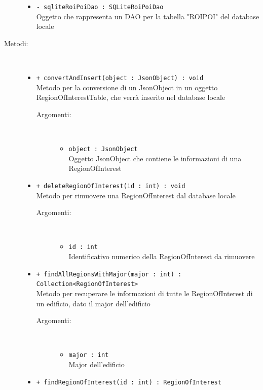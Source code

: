\documentclass[../DefinizioneDiProdotto.tex]{subfiles}
\begin{document}
\begin{description}
\begin{itemize}
\item \texttt{- sqliteRoiPoiDao : SQLiteRoiPoiDao}\\
Oggetto che rappresenta un DAO per la tabella "ROIPOI" del database locale

\end{itemize}
\item[Metodi:] \
\begin{itemize}
\item \texttt{+ convertAndInsert(object : JsonObject) : void}\\
Metodo per la conversione di un JsonObject in un oggetto RegionOfInterestTable, che verrà inserito nel database locale
 \begin{description}
\item[Argomenti:] \
\begin{itemize}
\item \texttt{object : JsonObject}\\
Oggetto JsonObject che contiene le informazioni di una RegionOfInterest\end{itemize}
\end{description}
\item \texttt{+ deleteRegionOfInterest(id : int) : void}\\
Metodo per rimuovere una RegionOfInterest dal database locale
 \begin{description}
\item[Argomenti:] \
\begin{itemize}
\item \texttt{id : int}\\
Identificativo numerico della RegionOfInterest da rimuovere\end{itemize}
\end{description}
\item \texttt{+ findAllRegionsWithMajor(major : int) : Collection<RegionOfInterest>}\\
Metodo per recuperare le informazioni di tutte le RegionOfInterest di un edificio, dato il major dell'edificio
 \begin{description}
\item[Argomenti:] \
\begin{itemize}
\item \texttt{major : int}\\
Major dell'edificio\end{itemize}
\end{description}
\item \texttt{+ findRegionOfInterest(id : int) : RegionOfInterest}\\

\end{itemize}
\end{description}
\end{document}
